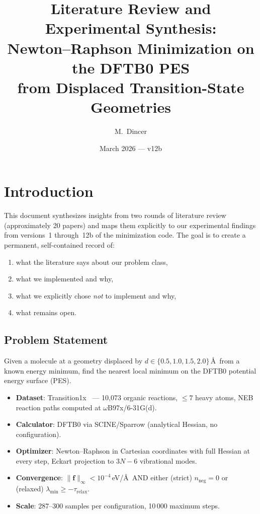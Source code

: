 \documentclass[11pt,a4paper]{article}
\title{Literature Review and Experimental Synthesis:\\
  Newton--Raphson Minimization on the DFTB0 PES\\
  from Displaced Transition-State Geometries}
\author{M.\ Dincer}
\date{March 2026 --- v12b}
\newcommand{\vect}[1]{\bm{#1}}
\newcommand{\norm}[1]{\lVert #1 \rVert}
\theoremstyle{definition}
\begin{document}
\maketitle

\tableofcontents
\newpage

\section{Introduction}
\label{sec:intro}

This document synthesizes insights from two rounds of literature review
(approximately 20 papers) and maps them explicitly to our experimental
findings from versions~1 through~12b of the minimization code.
The goal is to create a permanent, self-contained record of:
\begin{enumerate}[nosep]
  \item what the literature says about our problem class,
  \item what we implemented and why,
  \item what we explicitly chose \emph{not} to implement and why,
  \item what remains open.
\end{enumerate}

\subsection{Problem Statement}

Given a molecule at a geometry displaced by $d \in \{0.5, 1.0, 1.5, 2.0\}$\,\AA\
from a known energy minimum, find the nearest local minimum on the DFTB0
potential energy surface (PES).
\begin{itemize}[nosep]
  \item \textbf{Dataset}: Transition1x~\citep{transition1x} --- 10,073 organic
    reactions, $\leq 7$ heavy atoms, NEB reaction paths computed at
    $\omega$B97x/6-31G(d).
  \item \textbf{Calculator}: DFTB0 via SCINE/Sparrow (analytical Hessian, no
    configuration).
  \item \textbf{Optimizer}: Newton--Raphson in Cartesian coordinates with full
    Hessian at every step, Eckart projection to $3N{-}6$ vibrational modes.
  \item \textbf{Convergence}: $\norm{\vect{f}}_\infty < 10^{-4}$\,eV/\AA\
    AND either (strict) $n_\text{neg} = 0$ or (relaxed) $\lambda_\text{min}
    \geq -\tau_\text{relax}$.
  \item \textbf{Scale}: 287--300 samples per configuration, 10\,000 maximum
    steps.
\end{itemize}
\end{document}
